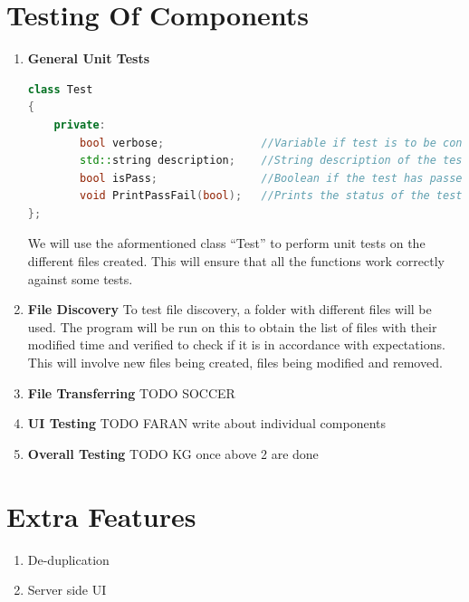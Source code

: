\documentclass{article}
\begin{document}
	\section{Testing Of Components}
		\begin{enumerate}
			\item \textbf{General Unit Tests}
				\newline
				\begin{lstlisting}[language=C++, caption={Class Parameters for Test}]
class Test
{
	private:
		bool verbose;               //Variable if test is to be conducted
		std::string description;    //String description of the test
		bool isPass;                //Boolean if the test has passed 
		void PrintPassFail(bool);   //Prints the status of the test
};
				\end{lstlisting}

				We will use the aformentioned class ``Test'' to perform unit tests on the different files created. This will ensure that all the functions work correctly against some tests.

			\item \textbf{File Discovery}
				\newline
				To test file discovery, a folder with different files will be used. The program will be run on this to obtain the list of files with their modified time and verified to check if it is in accordance with expectations. This will involve new files being created, files being modified and removed.
			\item \textbf{File Transferring}
				\newline
				TODO SOCCER
			\item \textbf{UI Testing}
				\newline
				TODO FARAN write about individual components
			\item \textbf{Overall Testing}
				\newline
				TODO KG once above 2 are done
		\end{enumerate}

	\section{Extra Features}
		\begin{enumerate}
			\item De-duplication
			\item Server side UI
		\end{enumerate}
\end{document}
